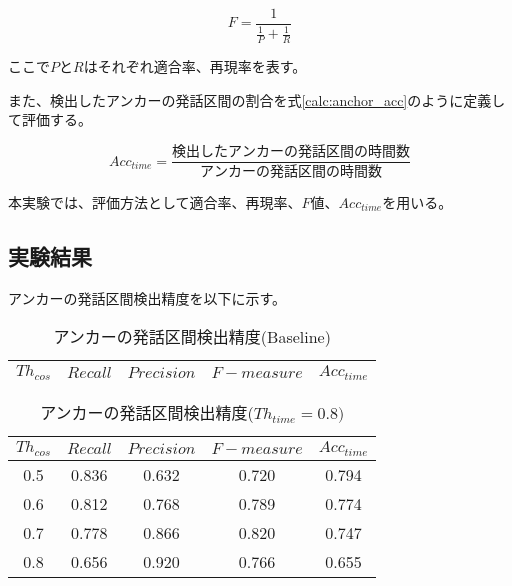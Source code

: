 \begin{equation}
\label{calc:fmeasure2}
F = \frac{1}{\frac{1}{P} + \frac{1}{R}}
\end{equation}

ここで$P$と$R$はそれぞれ適合率、再現率を表す。

また、検出したアンカーの発話区間の割合を式\ref{calc:anchor_acc}のように定義して評価する。

\begin{equation}
\label{calc:anchor_acc}
Acc_{time} = \frac{検出したアンカーの発話区間の時間数}{アンカーの発話区間の時間数}
\end{equation}

本実験では、評価方法として適合率、再現率、$F$値、$Acc_{time}$を用いる。

\subsection{実験結果}
アンカーの発話区間検出精度を以下に示す。


\begin{table}[H]
  \begin{center}
    \caption{アンカーの発話区間検出精度(Baseline) \label{table:result_get_anchor_baseline}}
    \begin{tabular}{|c||c|c|c|c|} \hline
      $Th_{cos}$ & $Recall$ & $Precision$ & $F-measure$ & $Acc_{time}$\\ \hline

    \end{tabular}
  \end{center}
\end{table}

\begin{table}[H]
  \begin{center}
    \caption{アンカーの発話区間検出精度($Th_{time}=0.8)$ \label{table:result_get_anchor08}}
    \begin{tabular}{|c||c|c|c|c|} \hline
      $Th_{cos}$ & $Recall$ & $Precision$ & $F-measure$ & $Acc_{time}$\\ \hline
0.5 & 0.836 & 0.632 & 0.720 & 0.794 \\ \hline
0.6 & 0.812 & 0.768 & 0.789 & 0.774 \\ \hline
0.7 & 0.778 & 0.866 & 0.820 & 0.747 \\ \hline
0.8 & 0.656 & 0.920 & 0.766 & 0.655 \\ \hline

    \end{tabular}
  \end{center}
\end{table}

